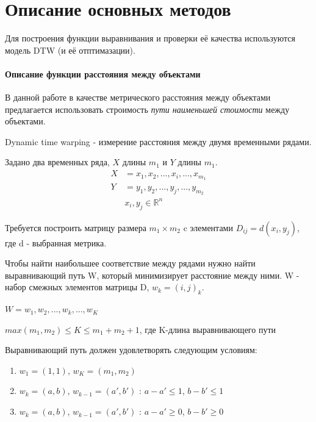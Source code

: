 \documentclass[12pt,twoside]{article}
\begin{document}
    \section{Описание основных методов}
        
        Для построения функции выравнивания и проверки её качества используются модель DTW (и её отптимазации).
            
    \paragraph{Описание функции расстояния между объектами}

        В данной работе в качестве метрического расстояния между объектами предлагается использовать строимость
        \textit{пути наименьшей стоимости} между объектами.
            
        Dynamic time warping - измерение расстояния между двумя временными рядами.
            
        Задано два временных ряда, $X$ длины $m_1$ и $Y$ длины $m_1$.
            \begin{align*}
                X &= x_1,x_2, ..., x_i, ..., x_{m_1} \\
                Y &= y_1,y_2, ..., y_j, ..., y_{m_2} \\
                & x_i, y_j \in \mathbb{R}^n
            \end{align*}

        Требуется построить матрицу размера $m_1\times m_2$ c элементами $D_{ij}=d(x_i, y_j)$, где d - выбранная метрика.
            
        Чтобы найти наибольшее соответствие между рядами нужно найти выравнивающий путь W, который минимизирует расстояние между ними.
        W - набор смежных элементов матрицы D, $w_k = (i, j)_k$.
            
            $W = w_1,w_2, ..., w_k, ..., w_K $

            $max(m_1, m_2)\leq K \leq m_1 + m_2 + 1$, где K-длина выравнивающего пути
            
        Выравнивающий путь должен удовлетворять следующим условиям:
            \begin{enumerate}[label=\arabic*)]
                \item $w_1=(1,1)$, $w_K=(m_1, m_2)$
                \item $w_k = (a, b)$, $w_{k-1}=(a', b')$ : $a-a' \leq 1$, $b-b' \leq 1$ 
                \item $w_k = (a, b)$, $w_{k-1}=(a', b')$ : $a-a' \geq 0$, $b-b'\geq 0$
            \end{enumerate}
\end{document}
